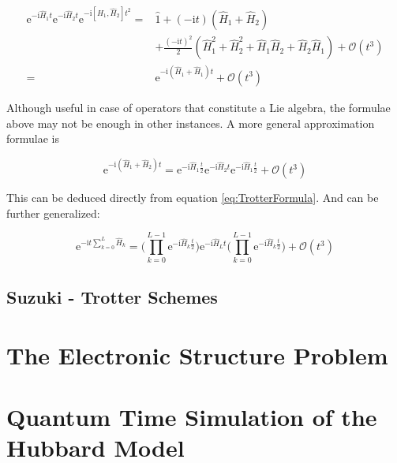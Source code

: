   \begin{align*}
    \mathrm{e}^{-\mathrm{i}\hat{H}_1t}\mathrm{e}^{-\mathrm{i}\hat{H}_2t}\mathrm{e}^{-\mathrm{i}[\hat{H}_1,\hat{H}_2]t^2} = & \hat{1} + (-\mathrm{i}t) (\hat{H}_1 + \hat{H}_2) \\
    & + \frac{(-\mathrm{i}t)^2}{2}(\hat{H}_1^2 + \hat{H}_2^2 + \hat{H}_1\hat{H}_2 + \hat{H}_2\hat{H}_1) + \mathcal{O}(t^3) \\
    = & \mathrm{e}^{-\mathrm{i}(\hat{H}_1 + \hat{H}_1)t} + \mathcal{O}(t^3)
    \label{eq:Hausdorf1}
  \end{align*}

  Although useful in case of operators that constitute a Lie algebra, the formulae above may not be enough in other instances. A more general approximation formulae is

  \begin{equation}
    \mathrm{e}^{-\mathrm{i}(\hat{H}_1 + \hat{H}_2)t} = \mathrm{e}^{-\mathrm{i}\hat{H}_1\frac{t}{2}}\mathrm{e}^{-\mathrm{i}\hat{H}_2t}\mathrm{e}^{-\mathrm{i}\hat{H}_1\frac{t}{2}} + \mathcal{O}(t^3)
    \label{eq:qubicorder}
  \end{equation}

  This can be deduced directly from equation \ref{eq:TrotterFormula}. And can be further generalized:

  \begin{equation}
    \mathrm{e}^{-\mathrm{i}t\sum_{k = 0}^{L}\hat{H}_k} = \Bigg(\prod_{k = 0}^{L-1}\mathrm{e}^{-\mathrm{i}\hat{H}_k\frac{t}{2}}\Bigg)\mathrm{e}^{-\mathrm{i}\hat{H}_Lt}\Bigg(\prod_{k = 0}^{L-1}\mathrm{e}^{-\mathrm{i}\hat{H}_k\frac{t}{2}}\Bigg) + \mathcal{O}(t^3)
    \label{eq:Suzuki0}
  \end{equation}

  \subsection{Suzuki - Trotter Schemes}
  \lipsum[2-4]


\section{The Electronic Structure Problem}
  \lipsum[2-4]

\section{Quantum Time Simulation of the Hubbard Model}
  \lipsum[2-4]
